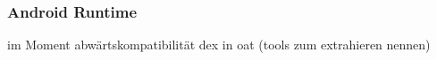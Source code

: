 \subsubsection{Android Runtime}\label{subsubsection:android-evolution-art}
im Moment abwärtskompatibilität dex in oat (tools zum extrahieren nennen)
